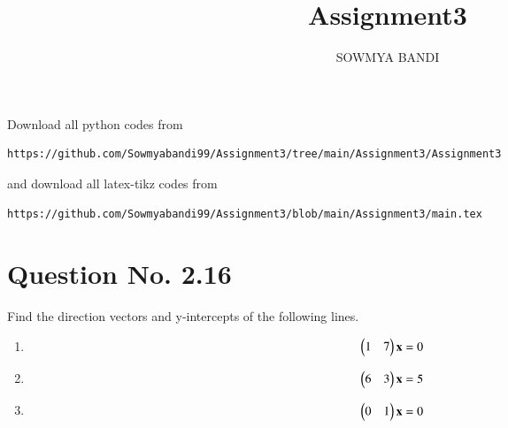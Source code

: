 \documentclass[journal,12pt,twocolumn]{IEEEtran}
\begin{document}
     \def\rightbox#1{\makebox[0in][r]{#1}}
     \def\centbox#1{\makebox[0in]{#1}}
     \def\topbox#1{\raisebox{-\baselineskip}[0in][0in]{#1}}
     \def\midbox#1{\raisebox{-0.5\baselineskip}[0in][0in]{#1}}
\vspace{3cm}
\title{Assignment3}
\author{SOWMYA BANDI}
\maketitle
\newpage
\bigskip
\renewcommand{\thefigure}{\theenumi}
\renewcommand{\thetable}{\theenumi}
Download all python codes from 
\begin{lstlisting}
https://github.com/Sowmyabandi99/Assignment3/tree/main/Assignment3/Assignment3
\end{lstlisting}
%
and download all latex-tikz codes from 
%
\begin{lstlisting}
https://github.com/Sowmyabandi99/Assignment3/blob/main/Assignment3/main.tex
\end{lstlisting}
%
\section{Question No. 2.16}
Find the direction vectors  and y-intercepts of the following lines.
\begin{enumerate}
\item
\begin{align}
\begin{split}
\begin{pmatrix}1 & 7\end{pmatrix}\mathbf{x}&=0  \label{eq1}
\end{split}
\end{align}
\item
\begin{align}
\begin{split}
\begin{pmatrix}6 & 3\end{pmatrix}\mathbf{x}&=5  \label{eq2}
\end{split}
\end{align}
\item
\begin{align}
\begin{split}
\begin{pmatrix}0 & 1\end{pmatrix}\mathbf{x}&=0  \label{eq3}
\end{split}
\end{align}
\end{enumerate}
%
\end{document}
